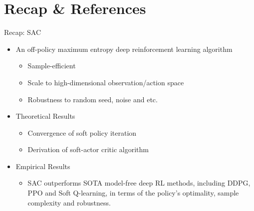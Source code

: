 \section{Recap \& References}
\begin{frame}{Recap: SAC}
\begin{itemize}
    \item An off-policy maximum entropy deep reinforcement learning algorithm
    \begin{itemize}
        \item Sample-efficient
        \item Scale to high-dimensional observation/action space
        \item Robustness to random seed, noise and etc.
    \end{itemize}
    \item Theoretical Results
    \begin{itemize}
        \item Convergence of soft policy iteration
        \item Derivation of soft-actor critic algorithm
    \end{itemize}
    \item Empirical Results
    \begin{itemize}
        \item SAC outperforms SOTA model-free deep RL methods, including DDPG, PPO and Soft Q-learning, in terms of the policy's optimality, sample complexity and robustness.
    \end{itemize}
\end{itemize}
\end{frame}
